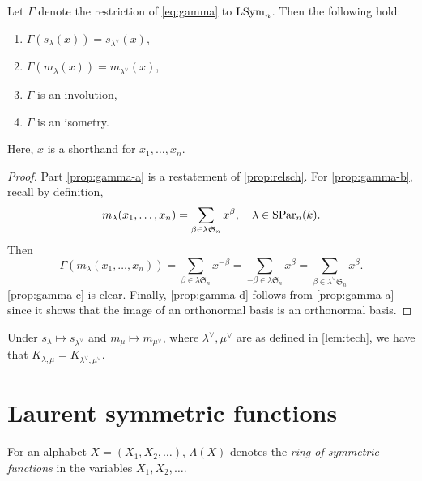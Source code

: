 \documentclass[11pt]{amsart}
\begin{document}
\begin{prop}\label{prop:gamma}
Let $\Gamma$ denote the restriction of \cref{eq:gamma} to $\mathrm{LSym}_n$. Then the following hold:
    \begin{enumerate}
        \item $\Gamma(s_{\lambda}(x)) = s_{\lambda^\vee}(x)$, \label{prop:gamma-a}
        \item $\Gamma(m_{\lambda}(x)) = m_{\lambda^\vee}(x)$,\label{prop:gamma-b}
        \item $\Gamma$ is an involution,\label{prop:gamma-c}
        \item $\Gamma$ is an isometry.\label{prop:gamma-d}
    \end{enumerate}
   Here, $x$ is a shorthand for $x_1, \dots, x_n$. 
\end{prop}
\begin{proof}
     Part \cref{prop:gamma-a} is a restatement of \cref{prop:relsch}. For \cref{prop:gamma-b}, recall by definition,
    \begin{align*}
    m_\lambda(x_1, \dots, x_n) =\sum_{\beta \in \lambda \mathfrak{S}_n} x^\beta, \quad \lambda \in \mathrm{SPar}_n(k).
\end{align*}
Then \[\Gamma(m_\lambda(x_1, \dots, x_n))=\sum_{\beta \in \lambda \mathfrak{S}_n} x^{-\beta}=\sum_{-\beta \in \lambda \mathfrak{S}_n} x^{\beta}=\sum_{\beta \in \lambda^\vee \mathfrak{S}_n} x^{\beta}.\] \cref{prop:gamma-c} is clear.  Finally, \cref{prop:gamma-d} follows from \cref{prop:gamma-a} since it shows that the image of an orthonormal basis is an orthonormal basis. 
\end{proof}

\begin{cor}
   Under $s_\lambda \mapsto s_{\lambda^\vee}$ and $m_\mu \mapsto m_{\mu^\vee}$, where $\lambda^\vee, \mu^\vee$ are as defined in \cref{lem:tech}, we have that \(K_{\lambda,{\mu}}=K_{\lambda^\vee,\mu^\vee}\).
\end{cor}

\section{Laurent symmetric functions} \label{sec:lsf}

\begin{defin}
    For an alphabet $X= (X_1, X_2, \dots) $, \emph{$\Lambda(X) $} denotes the \emph{ring of symmetric functions} in the variables $X_1, X_2 , \dots $.
\end{defin}
\end{document}
